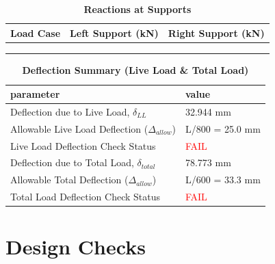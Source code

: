 \documentclass[12pt,a4paper]{report}
\numberwithin{table}{chapter}
\numberwithin{figure}{chapter}
\begin{document}
\vspace{1em}
\begin{longtable}{|>{\centering\arraybackslash}p{5.2cm}|>{\centering\arraybackslash}p{5.2cm}|>{\centering\arraybackslash}p{5.2cm}|}
\caption{\textbf{Reactions at Supports}}
\hline
\textbf{Load Case} & \textbf{Left Support (kN)} & \textbf{Right Support (kN)} \\[6pt]
\hline
 &  &  \\[6pt]
\hline
 &  &  \\[6pt]
\hline
 &  &  \\[6pt]
\hline
\end{longtable}

\vspace{1em}
\begin{longtable}{|L{7cm}|p{8.5cm}|}
\caption{\textbf{Deflection Summary (Live Load \& Total Load)}}
\hline
\textbf{parameter} & \textbf{value} \\
\hline
\textnormal{Deflection due to Live Load, $\delta_{LL}$} & 32.944 mm \\[6pt]
\hline
\textnormal{Allowable Live Load Deflection ($\Delta_{allow}$)} & L/800 = 25.0 mm \\[6pt]
\hline
\textnormal{Live Load Deflection Check Status} & \textcolor{red}{FAIL} \\[6pt]
\hline
\textnormal{Deflection due to Total Load, $\delta_{total}$} & 78.773 mm \\[6pt]
\hline
\textnormal{Allowable Total Deflection ($\Delta_{allow}$)} & L/600 = 33.3 mm \\[6pt]
\hline
\textnormal{Total Load Deflection Check Status} & \textcolor{red}{FAIL} \\[6pt]
\hline
\end{longtable}

\vspace{1em}
\noindent
\noindent{}
\noindent{}
\noindent{}


\chapter{Design Checks}
\end{document}
